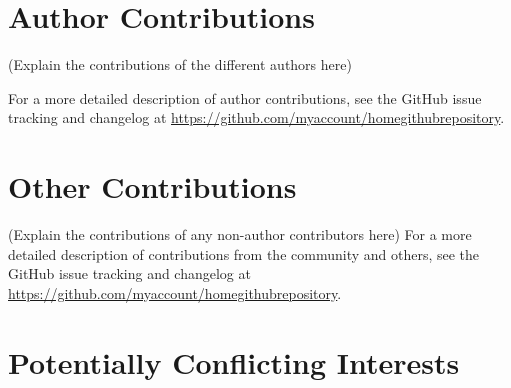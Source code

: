\documentclass[9pt,tutorial]{livecoms}
\newcommand{\githubrepository}{\url{https://github.com/myaccount/homegithubrepository}}  %
\begin{document}
\begin{Checklists}[h]
\end{Checklists}








\section*{Author Contributions}
%

(Explain the contributions of the different authors here)

For a more detailed description of author contributions,
see the GitHub issue tracking and changelog at \githubrepository.

\section*{Other Contributions}
%

(Explain the contributions of any non-author contributors here)
For a more detailed description of contributions from the community and others, see the GitHub issue tracking and changelog at \githubrepository.

\section*{Potentially Conflicting Interests}
\end{document}
